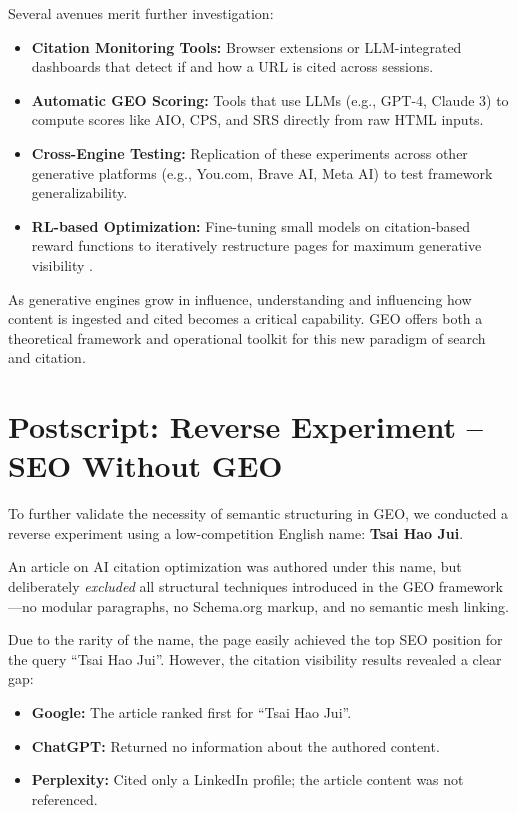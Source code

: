 Several avenues merit further investigation:

\begin{itemize}
  \item \textbf{Citation Monitoring Tools:} Browser extensions or LLM-integrated dashboards that detect if and how a URL is cited across sessions.
  \item \textbf{Automatic GEO Scoring:} Tools that use LLMs (e.g., GPT-4, Claude 3) to compute scores like AIO, CPS, and SRS directly from raw HTML inputs.
  \item \textbf{Cross-Engine Testing:} Replication of these experiments across other generative platforms (e.g., You.com, Brave AI, Meta AI) to test framework generalizability.
  \item \textbf{RL-based Optimization:} Fine-tuning small models on citation-based reward functions to iteratively restructure pages for maximum generative visibility \cite{luttgenau2025beyondseo}.
\end{itemize}

As generative engines grow in influence, understanding and influencing how content is ingested and cited becomes a critical capability. GEO offers both a theoretical framework and operational toolkit for this new paradigm of search and citation.

\section*{Postscript: Reverse Experiment – SEO Without GEO}

To further validate the necessity of semantic structuring in GEO, we conducted a reverse experiment using a low-competition English name: \textbf{Tsai Hao Jui}.

An article on AI citation optimization was authored under this name, but deliberately \emph{excluded} all structural techniques introduced in the GEO framework—no modular paragraphs, no Schema.org markup, and no semantic mesh linking.

Due to the rarity of the name, the page easily achieved the top SEO position for the query ``Tsai Hao Jui''. However, the citation visibility results revealed a clear gap:

\begin{itemize}
  \item \textbf{Google:} The article ranked first for ``Tsai Hao Jui''.
  \item \textbf{ChatGPT:} Returned no information about the authored content.
  \item \textbf{Perplexity:} Cited only a LinkedIn profile; the article content was not referenced.
\end{itemize}

